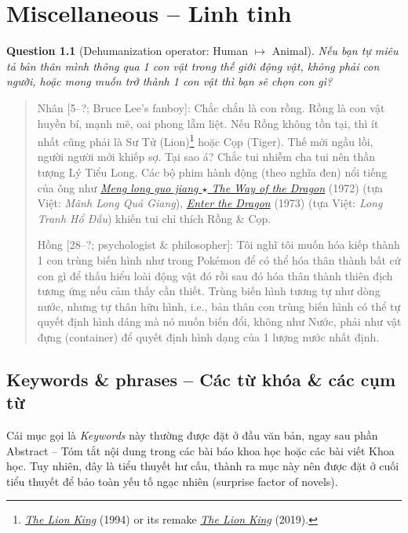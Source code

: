\documentclass[12pt,oneside]{book}
\newtheorem{question}{Question}
\begin{document}
\chapter{Miscellaneous -- Linh tinh}
\minitoc
\begin{question}[Dehumanization operator: Human $\mapsto$ Animal]
	Nếu bạn tự miêu tả bản thân mình thông qua 1 con vật trong thế giới động vật, không phải con người, hoặc mong muốn trở thành 1 con vật thì bạn sẽ chọn con gì?
\end{question}

\begin{quote}
	{\sf Nhân [5--?; {\sc Bruce Lee}'s fanboy]}: Chắc chắn là con rồng. Rồng là con vật huyền bí, mạnh mẽ, oai phong lẵm liệt. Nếu Rồng không tồn tại, thì ít nhất cũng phải là Sư Tử (Lion)\footnote{\href{https://www.imdb.com/title/tt0110357/}{\it The Lion King} (1994) or its remake \href{https://www.imdb.com/title/tt6105098/}{\it The Lion King} (2019).} hoặc Cọp (Tiger). Thế mới ngầu lồi, người người mới khiếp sợ. Tại sao á? Chắc tui nhiễm cha tui nên thần tượng {\sc Lý Tiểu Long}. Các bộ phim hành động (theo nghĩa đen) nổi tiếng của ông như \href{https://www.imdb.com/title/tt0068935}{\it Meng long guo jiang $\star$ The Way of the Dragon} (1972) (tựa Việt: {\it Mãnh Long Quá Giang}), \href{https://www.imdb.com/title/tt0070034}{\it Enter the Dragon} (1973) (tựa Việt: {\it Long Tranh Hổ Đấu}) khiến tui chỉ thích Rồng \& Cọp.
	
	{\sf Hồng [28--?; psychologist \& philosopher]}: Tôi nghĩ tôi muốn hóa kiếp thành 1 con trùng biến hình như trong Pokémon để có thể hóa thân thành bất cứ con gì để thấu hiểu loài động vật đó rồi sau đó hóa thân thành thiên địch tương ứng nếu cảm thấy cần thiết. Trùng biến hình tương tự như dòng nước, nhưng tự thân hữu hình, i.e., bản thân con trùng biến hình có thể tự quyết định hình dáng mà nó muốn biến đổi, không như Nước, phải như vật đựng (container) để quyết định hình dạng của 1 lượng nước nhất định.
\end{quote}

\section{Keywords \& phrases -- Các từ khóa \& các cụm từ}
Cái mục gọi là {\it Keywords} này thường được đặt ở đầu văn bản, ngay sau phần Abstract -- Tóm tắt nội dung trong các bài báo khoa học hoặc các bài viết Khoa học. Tuy nhiên, đây là tiểu thuyết hư cấu, thành ra mục này nên được đặt ở cuối tiểu thuyết để bảo toàn yếu tố ngạc nhiên (surprise factor of novels).
\end{document}
